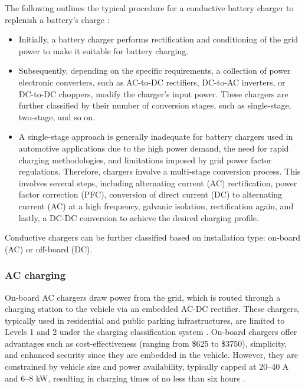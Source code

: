 \documentclass{thesis}
\begin{document}
The following outlines the typical procedure for a conductive battery charger to replenish a battery's charge \cite{charging_types}:
\begin{itemize}
    \item Initially, a battery charger performs rectification and conditioning of the grid power to make it suitable for battery charging.
    \item Subsequently, depending on the specific requirements, a collection of power electronic converters, such as AC-to-DC rectifiers, DC-to-AC inverters, or DC-to-DC choppers, modify the charger's input power. These chargers are further classified by their number of conversion stages, such as single-stage, two-stage, and so on.
   \item A single-stage approach is generally inadequate for battery chargers used in automotive applications due to the high power demand, the need for rapid charging methodologies, and limitations imposed by grid power factor regulations. Therefore, chargers involve a multi-stage conversion process. This involves several steps, including alternating current (AC) rectification, power factor correction (PFC), conversion of direct current (DC) to alternating current (AC) at a high frequency, galvanic isolation, rectification again, and lastly, a DC-DC conversion to achieve the desired charging profile.
\end{itemize}

Conductive chargers can be further classified based on installation type: on-board (AC) or off-board (DC).

\subsubsection{AC charging}
On-board AC chargers draw power from the grid, which is routed through a charging station to the vehicle via an embedded AC-DC rectifier. These chargers, typically used in residential and public parking infrastructures, are limited to Levels 1 and 2 under the charging classification system \cite{33_in_EVCM}. On-board chargers offer advantages such as cost-effectiveness (ranging from \$625 to \$3750), simplicity, and enhanced security since they are embedded in the vehicle. However, they are constrained by vehicle size and power availability, typically capped at 20–40 A and 6–8 kW, resulting in charging times of no less than six hours \cite{31_in_EVCM}.
\end{document}

